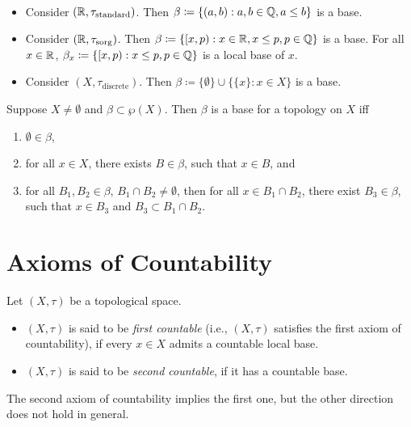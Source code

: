 \documentclass{techreport}
\begin{document}
\begin{example}\
	\begin{itemize}
		\item Consider $(\mathbb{R},\tau_{\mathrm{standard}})$. Then $\beta \coloneqq \{ (a,b) : a,b \in \mathbb{Q}, a \le b \}$ is a base.
		\item Consider $(\mathbb{R},\tau_{\mathrm{sorg}})$.
		Then $\beta \coloneqq \{ [x,p) : x \in \mathbb{R}, x \le p, p \in \mathbb{Q}\}$ is a base.
		For all $x \in \mathbb{R}$, $\beta_x \coloneqq \{ [x,p) : x \le p, p \in \mathbb{Q} \}$ is a local base of $x$.
		\item Consider $(X,\tau_{\mathrm{discrete}})$. Then $\beta \coloneqq \{ \emptyset \} \cup \{ \{x \} : x \in X \}$ is a base.
	\end{itemize}
\end{example}

\begin{proposition}
	Suppose $X \neq \emptyset$ and $\beta \subset \wp(X)$.
	Then $\beta$ is a base for a topology on $X$ iff
	\begin{enumerate}
		\item $\emptyset \in \beta$,
		\item for all $x \in X$, there exists $B \in \beta$, such that $x \in B$, and
		\item for all $B_1,B_2 \in \beta$, $B_1 \cap B_2 \neq \emptyset$, then for all $x \in B_1 \cap B_2$, there exist $B_3 \in \beta$, such that $x \in B_3$ and $B_3 \subset B_1 \cap B_2$.
	\end{enumerate}
\end{proposition}

\section{Axioms of Countability}

\begin{definition}
	Let $(X,\tau)$ be a topological space.
	\begin{itemize}
		\item $(X,\tau)$ is said to be \emph{first countable} (i.e., $(X,\tau)$ satisfies the first axiom of countability), if every $x \in X$ admits a countable local base.
		\item $(X,\tau)$ is said to be \emph{second countable}, if it has a countable base.
	\end{itemize}
\end{definition}

\begin{remark}
	The second axiom of countability implies the first one, but the other direction does not hold in general.
\end{remark}
\end{document}
